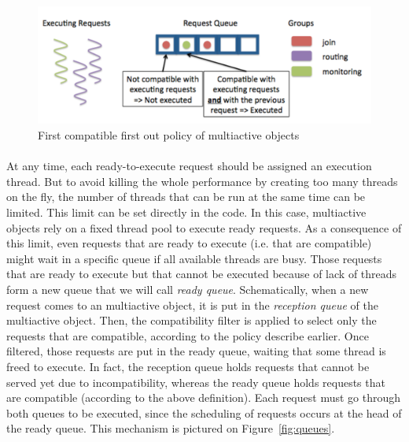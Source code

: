 \documentclass[11pt]{report}
\begin{document}
\begin{figure}[ht]
      \begin{minipage}[c]{\textwidth}
      \centering
      \includegraphics[scale=0.5]{pictures/multiactive_object.pdf}
      \end{minipage}
      \caption{First compatible first out policy of multiactive objects}
      \label{fig:multiactive_object}
\end{figure}

\paragraph{}
At any time, each ready-to-execute request should be assigned an execution thread. But to avoid killing the whole performance by creating too many threads on the fly, the number of threads that can be run at the same time can be limited. This limit can be set directly in the code. In this case, multiactive objects rely on a fixed thread pool to execute ready requests.  
As a consequence of this limit, even requests that are ready to execute (i.e. that are compatible) might wait in a specific queue if all available threads are busy. Those requests that are ready to execute but that cannot be executed because of lack of threads form a new queue that we will call \emph{ready queue}. 
Schematically, when a new request comes to an multiactive object, it is put in the \emph{reception queue} of the multiactive object. Then, the compatibility filter is applied to select only the requests that are compatible, according to the policy describe earlier. Once filtered, those requests are put in the ready queue, waiting that some thread is freed to execute. In fact, the reception queue holds requests that cannot be served yet due to incompatibility, whereas the ready queue holds requests that are compatible (according to the above definition). Each request must go through both queues to be executed, since the scheduling of requests occurs at the head of the ready queue. This mechanism is pictured on Figure~\ref{fig:queues}.
\end{document}
